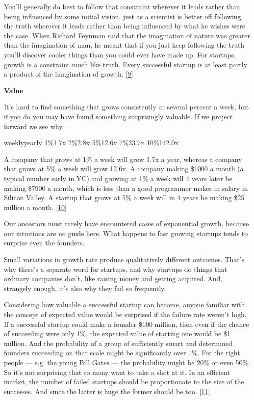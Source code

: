 You'll generally do best to follow that constraint wherever it leads
rather than being influenced by some initial vision, just as a
scientist is better off following the truth wherever it leads rather
than being influenced by what he wishes were the case.  When Richard
Feynman said that the imagination of nature was greater than the
imagination of man, he meant that if you just keep following the
truth you'll discover cooler things than you could ever have made
up. For startups, growth is a constraint much like truth. Every
successful startup is at least partly a product of the imagination
of growth.  
[\href{\#f9n}{9}]


\textbf{Value}

It's hard to find something that grows consistently at several
percent a week, but if you do you may have found something surprisingly
valuable.  If we project forward we see why.



weeklyyearly
1\%1.7x
2\%2.8x
5\%12.6x
7\%33.7x
10\%142.0x



A company that grows at 1\% a week will grow 1.7x a year, whereas a
company that grows at 5\% a week will grow 12.6x.  A company making
\$1000 a month (a typical number early in YC) and growing at 1\% a
week will 4 years later be making \$7900 a month, which is less than
a good programmer makes in salary in Silicon Valley.  A startup
that grows at 5\% a week will in 4 years be making \$25 million a
month. 
[\href{\#f10n}{10}]

Our ancestors must rarely have encountered cases of exponential
growth, because our intuitions are no guide here.  What happens
to fast growing startups tends to surprise even the founders.

Small variations in growth rate produce qualitatively different
outcomes.  That's why there's a separate word for startups, and why
startups do things that ordinary companies don't, like raising money
and getting acquired.  And, strangely enough, it's also why they
fail so frequently.

Considering how valuable a successful startup can become, anyone
familiar with the concept of expected value would be surprised if
the failure rate weren't high.  If a successful startup could make
a founder \$100 million, then even if the chance of succeeding were
only 1\%, the expected value of starting one would be \$1 million.
And the probability of a group of sufficiently smart and determined
founders succeeding on that scale might be significantly over 1\%.
For the right people --- e.g. the young Bill Gates --- the probability
might be 20\% or even 50\%.  So it's not surprising that so many want
to take a shot at it.  In an efficient market, the number of failed
startups should be proportionate to the size of the successes.  And
since the latter is huge the former should be too. 
[\href{\#f11n}{11}]

